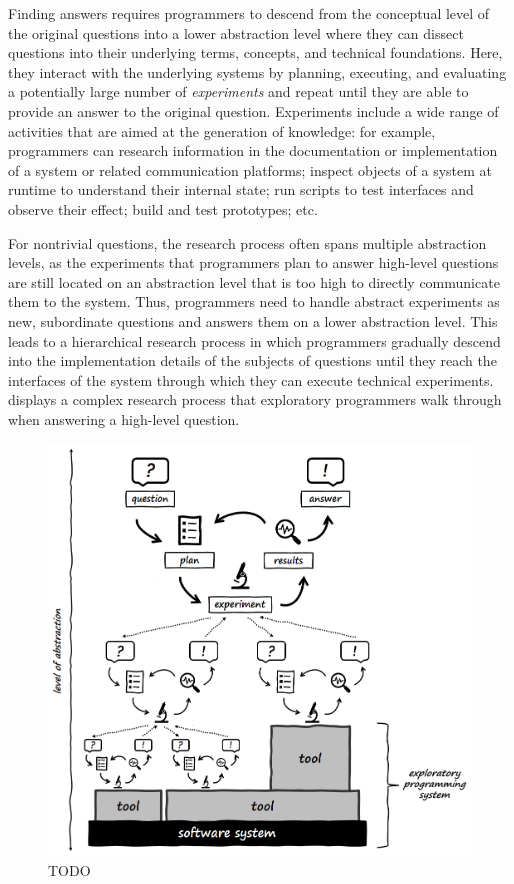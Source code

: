 Finding answers requires programmers to descend from the conceptual level of the original questions into a lower abstraction level where they can dissect questions into their underlying terms, concepts, and technical foundations.
Here, they interact with the underlying systems by planning, executing, and evaluating a potentially large number of \emph{experiments} and repeat until they are able to provide an answer to the original question.
Experiments include a wide range of activities that are aimed at the generation of knowledge:
for example, programmers can research information in the documentation or implementation of a system or related communication platforms; inspect objects of a system at runtime to understand their internal state; run scripts to test interfaces and observe their effect; build and test prototypes; etc.

For nontrivial questions, the research process often spans multiple abstraction levels, as the experiments that programmers plan to answer high-level questions are still located on an abstraction level that is too high to directly communicate them to the system.
Thus, programmers need to handle abstract experiments as new, subordinate questions and answers them on a lower abstraction level.
This leads to a hierarchical research process in which programmers gradually descend into the implementation details of the subjects of questions until they reach the interfaces of the system through which they can execute technical experiments.
 displays a complex research process that exploratory programmers walk through when answering a high-level question.

\begin{figure}
	\centering
	\includegraphics[draft]{01_exp/complex_process}
	\caption[TODO]{TODO}
	\label{fig:background/exp/complex_process}
\end{figure}

